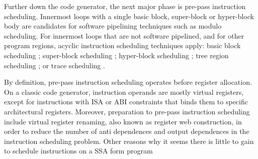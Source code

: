 Further down the code generator, the next major phase is pre-pass instruction
scheduling. Innermost loops with a single basic block, super-block or
hyper-block body are candidates for software pipelining techniques such as
modulo scheduling. For innermost loops that are not software pipelined, and for
other program regions, acyclic instruction scheduling techniques apply: basic
block scheduling \cite{Goodman:1988:ICS}; super-block scheduling
\cite{Hwu:1993:JS}; hyper-block scheduling \cite{Mahlke:1992:MICRO}; tree region
scheduling \cite{Havanki:1998:HPCA}; or trace scheduling \cite{Lowney:1993:JS}.

By definition, pre-pass instruction scheduling operates before register
allocation. On a classic code generator, instruction operands are mostly virtual
registers, except for instructions with ISA or ABI constraints that binds them
to specific architectural registers. Moreover, preparation to pre-pass
instruction scheduling include virtual register renaming, also known as register
web construction, in order to reduce the number of anti dependences and output
dependences in the instruction scheduling problem. Other reasons why it seems
there is little to gain to schedule instructions on a SSA form program
